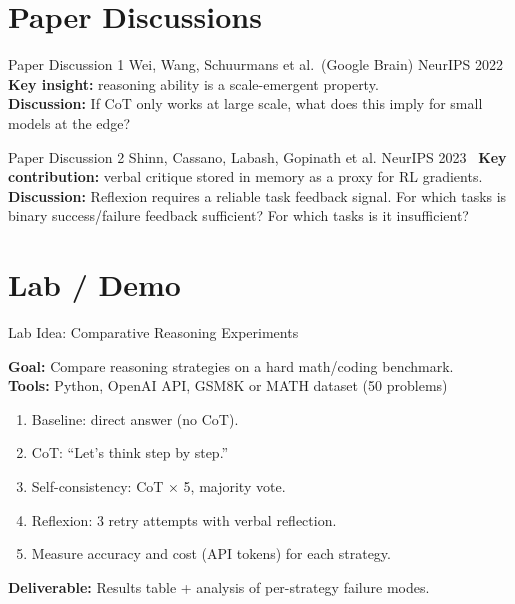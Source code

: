 \documentclass[aspectratio=169,10pt]{beamer}
\begin{document}
\section{Paper Discussions}
\begin{frame}{Paper Discussion 1}
    {Wei, Wang, Schuurmans et al.\ (Google Brain)}
    {NeurIPS 2022~\cite{wei2022chain}}
  \vspace{0.4em}
  \textbf{Key insight:} reasoning ability is a scale-emergent property.\\
  \textbf{Discussion:} If CoT only works at large scale, what does this imply for small models at the edge?
\end{frame}

\begin{frame}{Paper Discussion 2}
    {Shinn, Cassano, Labash, Gopinath et al.}
    {NeurIPS 2023~\cite{shinn2023reflexion}}
  \vspace{0.4em}
  \textbf{Key contribution:} verbal critique stored in memory as a proxy for RL gradients.\\
  \textbf{Discussion:} Reflexion requires a reliable task feedback signal. For which tasks
  is binary success/failure feedback sufficient? For which tasks is it insufficient?
\end{frame}

\section{Lab / Demo}
\begin{frame}{Lab Idea: Comparative Reasoning Experiments}
  \begin{tcolorbox}[hitbox, title=Lab 8 — CoT vs.\ ToT vs.\ Reflexion]
    \textbf{Goal:} Compare reasoning strategies on a hard math/coding benchmark.\\[4pt]
    \textbf{Tools:} Python, OpenAI API, GSM8K or MATH dataset (50 problems)
    \begin{enumerate}
      \item Baseline: direct answer (no CoT).
      \item CoT: ``Let's think step by step.''
      \item Self-consistency: CoT × 5, majority vote.
      \item Reflexion: 3 retry attempts with verbal reflection.
      \item Measure accuracy and cost (API tokens) for each strategy.
    \end{enumerate}
    \textbf{Deliverable:} Results table + analysis of per-strategy failure modes.
  \end{tcolorbox}
\end{frame}
\end{document}
